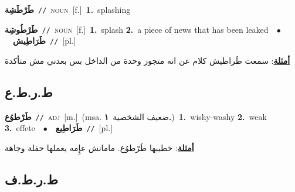\documentclass[10pt,a4paper,twoside]{article} %
\begin{document}
\begin{multicols}{2}
{\setlength\topsep{0pt}\textbf{\foreignlanguage{arabic}{طَرْطَشِة}}\ {\color{gray}\texttt{//}\color{black}}\ \textsc{noun}\ [f.]\ \textbf{1.}~splashing\ } \vspace{2mm}

{\setlength\topsep{0pt}\textbf{\foreignlanguage{arabic}{طَرْطُوشِة}}\ {\color{gray}\texttt{//}\color{black}}\ \textsc{noun}\ [f.]\ \textbf{1.}~splash  \textbf{2.}~a piece of news that has been leaked\ \ $\bullet$\ \ \setlength\topsep{0pt}\textbf{\foreignlanguage{arabic}{طَرَاطِيش}}\ {\color{gray}\texttt{//}\color{black}}\ [pl.]\  \begin{flushright}\color{gray}\foreignlanguage{arabic}{\textbf{\underline{\foreignlanguage{arabic}{أمثلة}}}: سمعت طَراطيش كلام عن انه متجوز وحدة من الداخل بس بعدني مش متأكدة}\end{flushright}\color{black}} \vspace{2mm}

\vspace{-3mm}
\subsection*{\color{blue}\foreignlanguage{arabic}{ط.ر.ط.ع}\color{blue}{}} 

{\setlength\topsep{0pt}\textbf{\foreignlanguage{arabic}{طَرْطوُع}}\ {\color{gray}\texttt{//}\color{black}}\ \textsc{adj}\ [m.]\ \color{gray}(msa. \foreignlanguage{arabic}{ضعيف الشخصية}~\foreignlanguage{arabic}{\textbf{١.}})\color{black}\ \textbf{1.}~wishy-washy  \textbf{2.}~weak  \textbf{3.}~effete\ \ $\bullet$\ \ \setlength\topsep{0pt}\textbf{\foreignlanguage{arabic}{طَرَاطِيع}}\ {\color{gray}\texttt{//}\color{black}}\ [pl.]\  \begin{flushright}\color{gray}\foreignlanguage{arabic}{\textbf{\underline{\foreignlanguage{arabic}{أمثلة}}}: خطيبها طَرْطوُع. مامانش عإِمه يعملها حفلة وجاهة}\end{flushright}\color{black}} \vspace{2mm}

\vspace{-3mm}
\subsection*{\color{blue}\foreignlanguage{arabic}{ط.ر.ط.ف}\color{blue}{}} 


\end{multicols}
\end{document}
